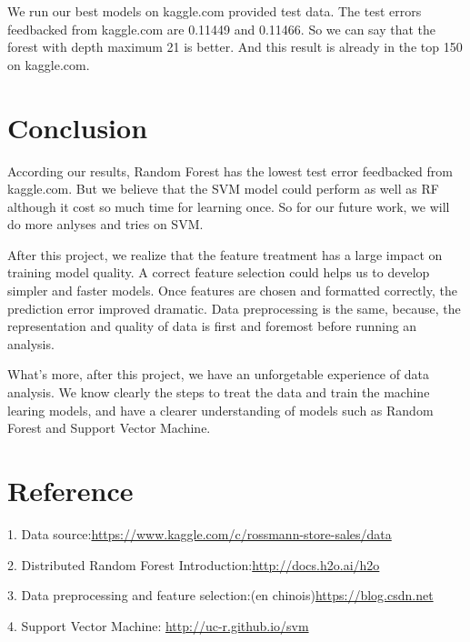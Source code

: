 \documentclass[a4paper]{article}
\begin{document}
	We run our best models on kaggle.com provided test data. The test errors feedbacked	from kaggle.com are 0.11449 and 0.11466. So we can say that the forest with depth maximum 21 is better. And this result is already in the top 150 on kaggle.com. 
\newpage
\section{\textbf{Conclusion}}

According our results,  Random Forest has the lowest test error feedbacked from kaggle.com. But we believe that the SVM model could perform as well as RF although it cost so much time for learning once. So for our future work, we will do more anlyses and tries on SVM.

After this project, we realize that the feature treatment has a large impact on training model quality. A correct feature selection could helps us to develop simpler and faster models. Once features are chosen and formatted correctly, the prediction error improved dramatic. Data preprocessing is the same, because, the representation and quality of data is first and foremost before running an analysis. 

What's more, after this project, we have an unforgetable experience of data analysis. We know clearly the steps to treat the data and train the machine learing models, and have a clearer understanding of models such as Random Forest and Support Vector Machine.

\section{\textbf{Reference}}

1. Data source:\href{https://www.kaggle.com/c/rossmann-store-sales/data}{https://www.kaggle.com/c/rossmann-store-sales/data}

2. Distributed Random Forest Introduction:\href{http://docs.h2o.ai/h2o/latest-stable/h2o-docs/data-science/drf.html}{http://docs.h2o.ai/h2o}

3. Data preprocessing and feature selection:(en chinois)\href{https://blog.csdn.net/u010089444/article/details/70053104}{https://blog.csdn.net}

4. Support Vector Machine: \href{http://uc-r.github.io/svm}{http://uc-r.github.io/svm}
\end{document}
